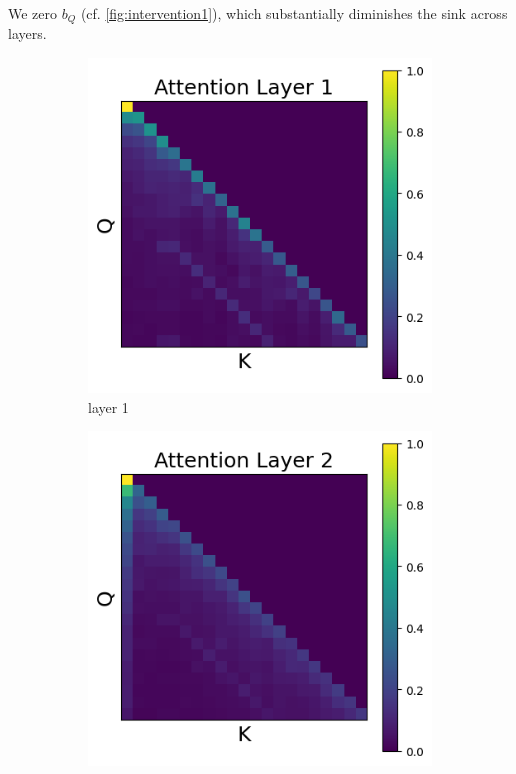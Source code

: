 \documentclass[11pt]{article}
\begin{document}
We zero $b_Q$ (cf. \cref{fig:intervention1}), which substantially diminishes the sink across layers.
\begin{figure}[t]
  \begin{subfigure}[t]{0.24\textwidth}
    \centering
    \includegraphics[width=1.4\columnwidth]{figures/intervention1/layer_1.png}
    \caption{layer 1}
  \end{subfigure}\hfill
  \begin{subfigure}[t]{0.24\textwidth}
    \centering
    \includegraphics[width=1.4\columnwidth]{figures/intervention1/layer_2.png}

\end{subfigure}
\end{figure}
\end{document}
